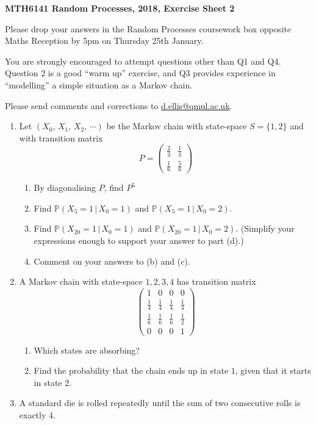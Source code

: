\documentclass[11pt,a4paper,twoside]{report}
\begin{document}
\textbf{MTH6141 Random Processes, 2018, Exercise Sheet 2}\par
Please drop your answers in the Random Processes coursework box opposite Maths Reception by 5pm on Thursday 25th January.\par
You are strongly encouraged to attempt questions other than Q1 and Q4. Question 2 is a good “warm up” exercise, and Q3 provides experience in “modelling” a simple situation as a Markov chain.\par
Please send comments and corrections to \href{d.ellis@qmul.ac.uk}{d.ellis@qmul.ac.uk}.

\begin{enumerate}
   \item Let $(X_0,\, X_1,\, X_2,\, \cdots)$ be the Markov chain with state-space $S=\{1,2\}$ and with transition matrix
   $$P = \begin{pmatrix}
   			\frac{2}{3} & \frac{1}{3}\\
   			\frac{1}{6} & \frac{5}{6}
   		\end{pmatrix}$$

   \begin{enumerate}
     \item By diagonalising $P$, find $P^5$
     \item Find $\mathbb{P}(X_5=1\, |\, X_0=1)$ and $\mathbb{P}(X_5 = 1\, |\, X_0 = 2)$.
     \item Find $\mathbb{P}(X_{20} = 1\, |\, X_0 = 1)$ and $\mathbb{P}(X_{20} = 1\, |\, X_0 = 2)$.  (Simplify your expressions enough to support your answer to part (d).)
	 \item Comment on your answers to (b) and (c).
   \end{enumerate}

   \item A Markov chain with state-space ${1, 2, 3, 4}$ has transition matrix
   		$$\begin{pmatrix}
   			1 & 0 & 0 & 0\\
   			\frac{1}{4} & \frac{1}{4} & \frac{1}{4} & \frac{1}{4}\\
   			\frac{1}{6} & \frac{1}{6} & \frac{1}{6} & \frac{1}{2}\\
   			0 & 0 & 0 & 1
   		 \end{pmatrix}$$

   \begin{enumerate}
     \item Which states are absorbing?
     \item Find the probability that the chain ends up in state $1$, given that it starts in state $2$.
   \end{enumerate}
   \item A standard die is rolled repeatedly until the sum of two consecutive rolls is exactly $4$.


\end{enumerate}
\end{document}
